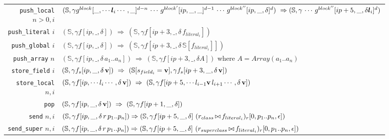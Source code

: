 \documentclass[11pt]{article}
\begin{document}
\begin{figure}
\begin{center}
\begin{tabular}[t]{r | l}
{\tt push\_local} $n > 0, i$ &
\begin{minipage}[t]{.78\linewidth}
$(\mathbb{S},\gamma g^{block}[\_,\cdots {\bm l_i} \cdots,\_]^{d-n} \,\cdots\, g^{block'}[ip,\_,\_]^{d-1}\,\cdots\, g^{block''}[ip,\_,\delta]^{d}) ~\Rightarrow\\
(\mathbb{S},\gamma\, \cdots \,g^{block''}[ip+5,\_,\delta {\bm l_i}]^{d})$
\end{minipage} \\

{\tt push\_literal} $i$ & $(\mathbb{S},\gamma f[ip,\_,\delta]) ~\Rightarrow~ (\mathbb{S},\gamma f[ip+3,\_,\delta \,f_{literal_i}])$ \\

{\tt push\_global} $i$  & $(\mathbb{S},\gamma f[ip,\_,\delta]) ~\Rightarrow~ (\mathbb{S},\gamma f[ip+3,\_,\delta \,\mathbb{S}[f_{literal_i}]])$ \\

{\tt push\_array} $n$  &  $(\mathbb{S},\gamma f[ip,\_,\delta\,a_1..a_n]) ~\Rightarrow~ (\mathbb{S}, \gamma f[ip+3,\_,\delta A])$ where $A = Array(a_1..a_n)$ \\

{\tt store\_field} $i$ & $(\mathbb{S}, \gamma f_s[ip,\_,\delta \,{\bf v}]) ~\Rightarrow~ (\mathbb{S}[s_{field_i} = {\bf v}],\gamma f_s[ip+3,\_,\delta\, {\bf v}])$ \\

{\tt store\_local} $n,i$ & $(\mathbb{S},\gamma f[ip, \cdots l_i\cdots,\delta \,{\bf v}]) ~\Rightarrow~ (\mathbb{S},\gamma f[ip+5,\cdots l_{i-1} {\bf v} \,l_{i+1}\cdots,\delta \,{\bf v}])$ \\

{\tt pop} & $(\mathbb{S},\gamma f[ip,\_,\delta \,{\bf v}]) ~\Rightarrow~ (\mathbb{S},\gamma f[ip+1,\_,\delta])$\\
\hline

{\tt send} $n,i$ & 
\begin{minipage}[c]{.78\linewidth}
$(\mathbb{S},\gamma f[ip,\_,\delta \,r\, p_1 .. p_{n}]) \Rightarrow 
(\mathbb{S},\gamma f[ip+5,\_,\delta] ~(r_{class}\,{\small \bowtie} \,f_{literal_i})_r[0,p_1 .. p_{n},\epsilon])$
\end{minipage}\\

{\tt send\_super} $n,i$ & 
\begin{minipage}[c]{.78\linewidth}
$(\mathbb{S},\gamma f[ip,\_,\delta \,r\, p_1 .. p_{n}]) \Rightarrow 
(\mathbb{S},\gamma f[ip+5,\_,\delta] ~(r_{superclass}\,{\small \bowtie} \,f_{literal_i})_r[0,p_1 .. p_{n},\epsilon])$
\end{minipage}\\


\end{tabular}
\end{center}
\end{figure}
\end{document}
